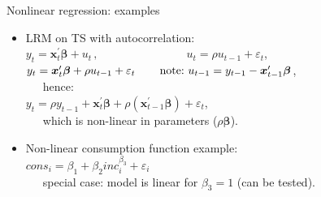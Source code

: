 \documentclass{beamer}
\begin{document}
\begin{frame}{Nonlinear regression: examples}
\begin{itemize}
    \item LRM on TS with autocorrelation:\\ \bigskip
    $y_t=\bm{x}_t^{\prime} \bm{\beta} + u_t \,,\qquad \qquad \qquad~~~~~~~\, u_t = \rho u_{t-1}+\varepsilon_t$,\\ \smallskip
    $y_t=\bm{x}_t^{\prime} \bm{\beta} +\rho u_{t-1}+\varepsilon_t \, \qquad \textnormal{note:~} u_{t-1} = y_{t-1} - \bm{x}_{t-1}^{\prime} \bm{\beta} $, \\ \smallskip ~~~hence: \\ \smallskip
    $y_t= \rho y_{t-1} + \bm{x}_t^{\prime} \bm{\beta} + \rho (\bm{x}_{t-1}^{\prime} \bm{\beta}) + \varepsilon_t$, \\ \smallskip ~~~which is non-linear in parameters ($\rho \bm{\beta}$). \\ \bigskip
    \item Non-linear consumption function example:\\ \bigskip 
    $\textit{cons}_i = \beta_1 + \beta_2 \textit{inc}_i^{\beta_3} + \varepsilon_i$
    \\ \medskip ~~~special case: model is linear for $\beta_3 = 1$ (can be tested).
\end{itemize}





    
\end{frame}
\end{document}
